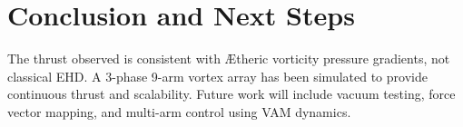 \section{Conclusion and Next Steps}
The thrust observed is consistent with Ætheric vorticity pressure gradients, not classical EHD. A 3-phase 9-arm vortex array has been simulated to provide continuous thrust and scalability. Future work will include vacuum testing, force vector mapping, and multi-arm control using VAM dynamics.
